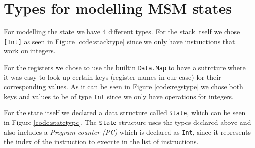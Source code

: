 \section{Types for modelling MSM states}
For modelling the state we have 4 different types. For the stack itself we chose
\texttt{[Int]} as seen in Figure \ref{code:stacktype} since we only have
instructions that work on integers.

For the registers we chose to use the builtin \texttt{Data.Map} to have a
sutrcture where it was easy to look up certain keys (register names in our case)
for their corresponding values. As it can be seen in Figure \ref{code:regstype}
we chose both keys and values to be of type \texttt{Int} since we only have
operations for integers.


For the state itself we declared a data structure called \texttt{State}, which
can be seen in Figure \ref{code:statetype}. The \texttt{State} structure uses
the types declared above and also includes a \textit{Program counter (PC)} which
is declared as \texttt{Int}, since it represents the index of the instruction to
execute in the list of instructions.

